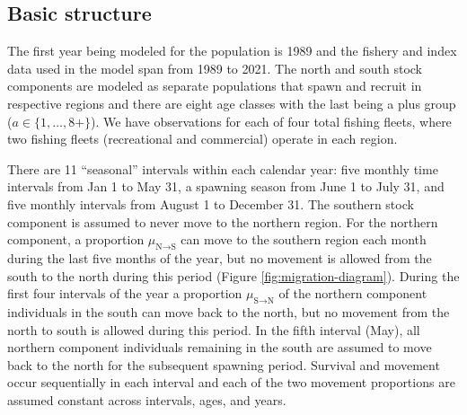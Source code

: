 \documentclass[
]{article}
\begin{document}
\hypertarget{basic-structure}{%
\subsection*{Basic structure}\label{basic-structure}}

The first year being modeled for the population is 1989 and the fishery and index data used in the model span from 1989 to 2021. The north and south stock components are modeled as separate populations that spawn and recruit in respective regions and there are eight age classes with the last being a plus group (\(a \in \{1,\ldots,8+\}\)). We have observations for each of four total fishing fleets, where two fishing fleets (recreational and commercial) operate in each region.

There are 11 ``seasonal'' intervals within each calendar year: five monthly time intervals from Jan 1 to May 31, a spawning season from June 1 to July 31, and five monthly intervals from August 1 to December 31. The southern stock component is assumed to never move to the northern region. For the northern component, a proportion \(\mu_{\text{N}\rightarrow \text{S}}\) can move to the southern region each month during the last five months of the year, but no movement is allowed from the south to the north during this period (Figure \ref{fig:migration-diagram}). During the first four intervals of the year a proportion \(\mu_{\text{S}\rightarrow \text{N}}\) of the northern component individuals in the south can move back to the north, but no movement from the north to south is allowed during this period. In the fifth interval (May), all northern component individuals remaining in the south are assumed to move back to the north for the subsequent spawning period. Survival and movement occur sequentially in each interval and each of the two movement proportions are assumed constant across intervals, ages, and years.
\end{document}
